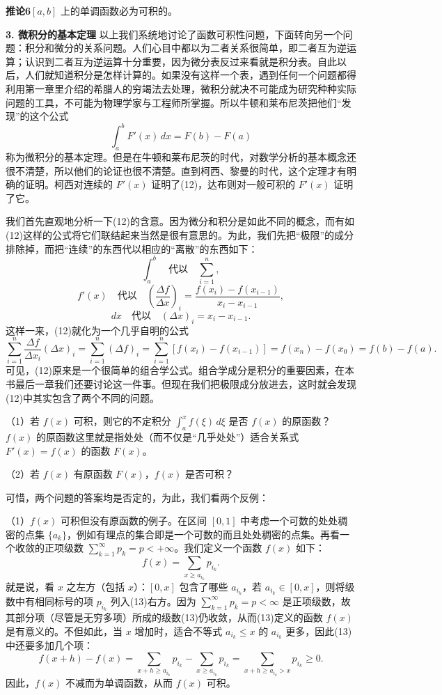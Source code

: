 \noindent\textbf{推论6}\quad $[a,b]$ 上的单调函数必为可积的。

\noindent\textbf{3. 微积分的基本定理}\quad
以上我们系统地讨论了函数可积性问题，下面转向另一个问题：积分和微分的关系问题。人们心目中都以为二者关系很简单，即二者互为逆运算；认识到二者互为逆运算十分重要，因为微分表反过来看就是积分表。自此以后，人们就知道积分是怎样计算的。如果没有这样一个表，遇到任何一个问题都得利用第一章里介绍的希腊人的穷竭法去处理，微积分就决不可能成为研究种种实际问题的工具，不可能为物理学家与工程师所掌握。所以牛顿和莱布尼茨把他们“发现”的这个公式
\begin{equation}
 \int_a^b F'(x)\,dx=F(b)-F(a)
 \tag{12}
\end{equation}
称为微积分的基本定理。但是在牛顿和莱布尼茨的时代，对数学分析的基本概念还很不清楚，所以他们的论证也很不清楚。直到柯西、黎曼的时代，这个定理才有明确的证明。柯西对连续的 $F'(x)$ 证明了(12)，达布则对一般可积的 $F'(x)$ 证明了它。

我们首先直观地分析一下(12)的含意。因为微分和积分是如此不同的概念，而有如(12)这样的公式将它们联结起来当然是很有意思的。为此，我们先把“极限”的成分排除掉，而把“连续”的东西代以相应的“离散”的东西如下：
\[
 \int_a^b\quad\text{代以}\quad\sum_{i=1}^{n},
\]
\[
 f'(x)\quad\text{代以}\quad\left(\frac{\Delta f}{\Delta x}\right)_i
 =\frac{f(x_i)-f(x_{i-1})}{x_i-x_{i-1}},
\]
\[
 dx\quad\text{代以}\quad(\Delta x)_i=x_i-x_{i-1}.
\]
这样一来，(12)就化为一个几乎自明的公式
\[
 \sum_{i=1}^{n}\frac{\Delta f}{\Delta x_i}(\Delta x)_i
 =\sum_{i=1}^{n}(\Delta f)_i
 =\sum_{i=1}^{n}[f(x_i)-f(x_{i-1})]
 =f(x_n)-f(x_0)=f(b)-f(a).
\]
可见，(12)原来是一个很简单的组合学公式。组合学成分是积分的重要因素，在本书最后一章我们还要讨论这一件事。但现在我们把极限成分放进去，这时就会发现(12)中其实包含了两个不同的问题。

（1）若 $f(x)$ 可积，则它的不定积分 $\int_a^x f(\xi)\,d\xi$ 是否 $f(x)$ 的原函数？$f(x)$ 的原函数这里就是指处处（而不仅是“几乎处处”）适合关系式 $F'(x)=f(x)$ 的函数 $F(x)$。

（2）若 $f(x)$ 有原函数 $F(x)$，$f(x)$ 是否可积？

可惜，两个问题的答案均是否定的，为此，我们看两个反例：

（1）$f(x)$ 可积但没有原函数的例子。在区间 $[0,1]$ 中考虑一个可数的处处稠密的点集 $\{a_k\}$，例如有理点的集合即是一个可数的而且处处稠密的点集。再看一个收敛的正项级数 $\sum_{k=1}^{\infty}p_k=p<+\infty$。我们定义一个函数 $f(x)$ 如下：
\begin{equation}
 f(x)=\sum_{x\ge a_{i_k}}p_{i_k}.
 \tag{13}
\end{equation}
就是说，看 $x$ 之左方（包括 $x$）：$[0,x]$ 包含了哪些 $a_{i_k}$，若 $a_{i_k}\in[0,x]$，则将级数中有相同标号的项 $p_{i_k}$ 列入(13)右方。因为 $\sum_{k=1}^{\infty}p_k=p<\infty$ 是正项级数，故其部分项（尽管是无穷多项）所成的级数(13)仍收敛，从而(13)定义的函数 $f(x)$ 是有意义的。不但如此，当 $x$ 增加时，适合不等式 $a_{i_k}\le x$ 的 $a_{i_k}$ 更多，因此(13)中还要多加几个项：
\begin{equation}
 f(x+h)-f(x)=\sum_{x+h\ge a_{i_k}}p_{i_k}-\sum_{x\ge a_{i_k}}p_{i_k}
 =\sum_{x+h\ge a_{i_k}>x}p_{i_k}\ge0.
 \tag{14}
\end{equation}
因此，$f(x)$ 不减而为单调函数，从而 $f(x)$ 可积。

